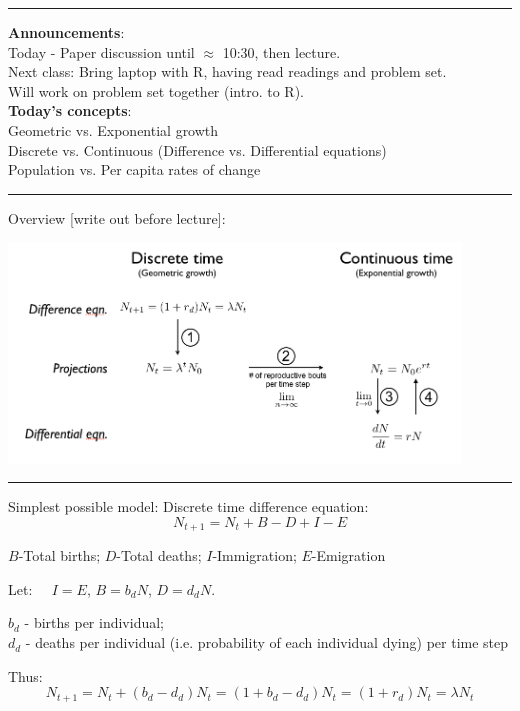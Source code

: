 \documentclass{article}
\newcommand{\note}[1]{\colorbox{gray!20}{#1}}
\newcommand*\circled[1]{\tikz[baseline=(char.base)]{
            \node[shape=circle,draw,inner sep=2pt] (char) {#1};}}
\begin{document}
\noindent{}

\rule[0.5ex]{\linewidth}{1pt}
\textbf{Announcements}: \\
Today - Paper discussion until $\approx$ 10:30, then lecture.\\
Next class: Bring laptop with R, having read readings and problem set. \\
Will work on problem set together (intro. to R).\\

\textbf{Today's concepts}: \\
Geometric vs. Exponential growth \\
Discrete vs. Continuous (Difference vs. Differential equations) \\
Population vs. Per capita rates of change

\rule[0.5ex]{\linewidth}{1pt}
Overview \note{[write out before lecture]}:
\begin{center}
\includegraphics[width=12cm]{figs/EqnConnections.png}
\end{center}
\rule[0.5ex]{\linewidth}{1pt}

\circled{1}
Simplest possible model: Discrete time difference equation:  
\begin{equation*}
N_{t+1}=N_t+B-D+I-E
\end{equation*}
\begin{center}
$B$-Total births; $D$-Total deaths; $I$-Immigration; $E$-Emigration
\end{center}

Let: $\;\;\;\ I=E$, $B=b_d N$, $D=d_d N$.
\begin{center}
	$b_d$ - births per individual; \\$d_d$ - deaths per individual (i.e. probability of each individual dying) per time step
\end{center}

Thus:
\begin{equation*}
	N_{t+1}=N_t+(b_d-d_d)N_t=(1+b_d-d_d)N_t=(1+r_d)N_t=\lambda N_t
\end{equation*}
\end{document}
